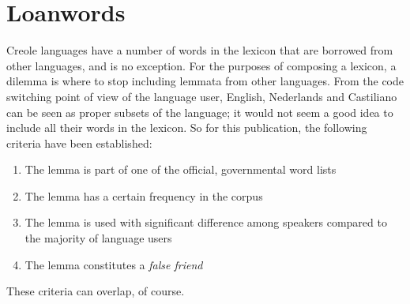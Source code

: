 \section{Loanwords}
Creole languages have a number of words in the lexicon that are borrowed from other languages, and \pap{} is no exception. For the purposes of composing a lexicon, a dilemma is where to stop including lemmata from other languages. From the code switching point of view of the language user, English, Nederlands and Castiliano can be seen as proper subsets of the \pap{} language; it would not seem a good idea to include all their words in the \pap{} lexicon. So for this publication, the following criteria have been established:
\begin{enumerate}
\item The lemma is part of one of the official, governmental word lists
\item The lemma has a certain frequency in the corpus
\item The lemma is used with significant difference among \pap{} speakers compared to the majority of language users
\item The lemma constitutes a \emph{false friend}
\end{enumerate}
These criteria can overlap, of course.
